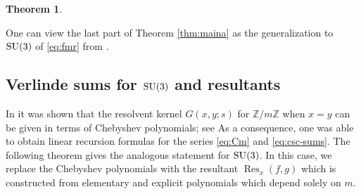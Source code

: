 \documentclass[11pt,reqno]{amsart}
\newtheorem{theorem}{Theorem}[section]
\theoremstyle{remark}
\DeclareMathOperator{\Res}{Res}
\begin{document}
\begin{theorem}
\end{theorem}


One can view the last part of Theorem \ref{thm:maina} as the generalization to $\text{\rm SU}(3)$ of
\eqref{eq:fmr} from \cite{JKS-cosecant}.

\subsection{Verlinde sums for \texorpdfstring{$\text{\rm SU}(3)$}{SU(3)} and resultants}

In \cite{JKS-cosecant} it was shown that the resolvent kernel $G(x,y;s)$ for $\mathbb{Z}/m\mathbb{Z}$ when
$x=y$ can be given in terms of Chebyshev polynomials; see %
As a consequence, one was able to obtain linear recursion formulas for the series \eqref{eq:Cm} and
\eqref{eq:csc-sums}.  The following theorem gives the analogous statement for $\textrm{\rm SU}(3)$.
In this case, we replace the Chebyshev polynomials with the resultant $\Res_x(f,g)$ which is constructed from
elementary and explicit polynomials which depend solely on $m$.
\end{document}
